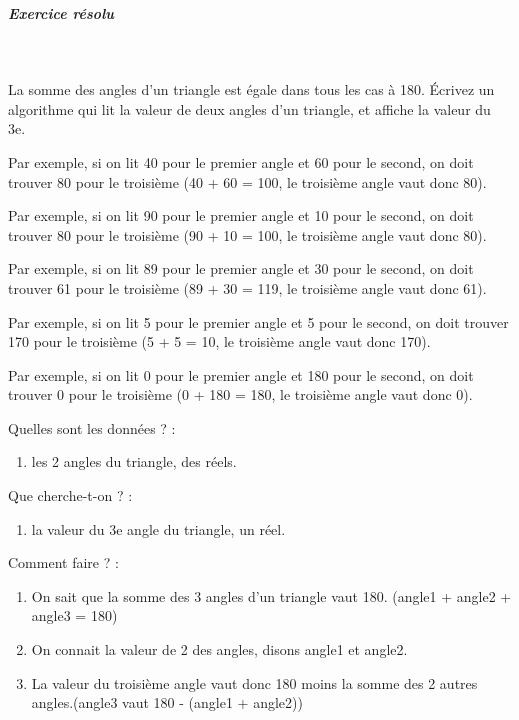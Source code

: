 \documentclass[11pt,a4paper]{article}
\begin{document}
			
		\subparagraph{Exercice r\'esolu} 
		
					\textcolor{white}{.} \par
				
          La somme des angles d'un triangle est \'egale dans tous les cas \`a 180\textdegree . \'Ecrivez un algorithme qui lit la valeur de deux angles d'un triangle, et affiche la valeur du 3e. 
        
            \par
        Par exemple, si on lit 40 pour le premier angle et 60 pour le second, on doit trouver 80 pour le troisi\`eme (40 + 60 = 100, le troisi\`eme angle vaut donc 80).
            \par
        Par exemple, si on lit 90 pour le premier angle et 10 pour le second, on doit trouver 80 pour le troisi\`eme (90 + 10 = 100, le troisi\`eme angle vaut donc 80).
            \par
        Par exemple, si on lit 89 pour le premier angle et 30 pour le second, on doit trouver 61 pour le troisi\`eme (89 + 30 = 119, le troisi\`eme angle vaut donc 61).
            \par
        Par exemple, si on lit 5 pour le premier angle et 5 pour le second, on doit trouver 170 pour le troisi\`eme (5 + 5 = 10, le troisi\`eme angle vaut donc 170).
            \par
        Par exemple, si on lit 0 pour le premier angle et 180 pour le second, on doit trouver 0 pour le troisi\`eme (0 + 180 = 180, le troisi\`eme angle vaut donc 0).
            \par
        
          Quelles sont les donn\'ees ? :
          
					\begin{enumerate}
				
			\item les 2 angles du triangle, des r\'eels.
					\end{enumerate}
				
          Que cherche-t-on ? :
          
					\begin{enumerate}
				
			\item la valeur du 3e angle du triangle, un r\'eel.
					\end{enumerate}
				
          Comment faire ? :
          
					\begin{enumerate}
				
			\item On sait que la somme des 3 angles d'un triangle vaut 180\textdegree . (angle1 + angle2 + angle3 = 180)
			\item On connait la valeur de 2 des angles, disons angle1 et angle2.
			\item La valeur du troisi\`eme angle vaut donc 180 moins la somme des 2 autres angles.(angle3 vaut 180 - (angle1 + angle2))
					\end{enumerate}
				
\end{document}
